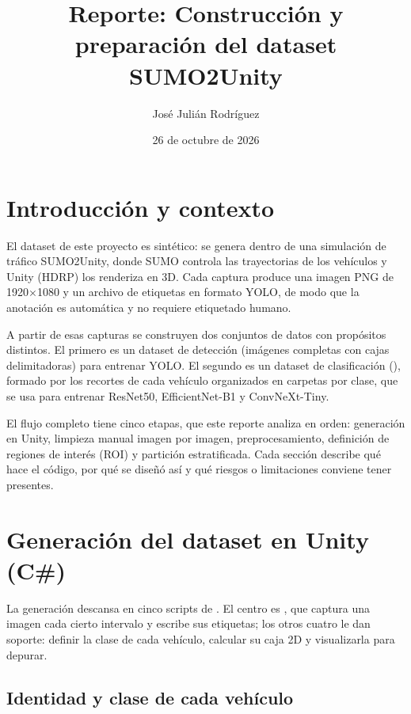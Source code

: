 \documentclass[11pt,a4paper]{article}
\title{Reporte: Construcción y preparación del dataset SUMO2Unity}
\author{José Julián Rodríguez}
\date{26 de octubre de 2026}
\begin{document}
\maketitle

\section{Introducción y contexto}

El dataset de este proyecto es sintético: se genera dentro de una simulación de tráfico SUMO2Unity, donde SUMO controla las trayectorias de los vehículos y Unity (HDRP) los renderiza en 3D. Cada captura produce una imagen PNG de 1920$\times$1080 y un archivo de etiquetas en formato YOLO, de modo que la anotación es automática y no requiere etiquetado humano.

A partir de esas capturas se construyen dos conjuntos de datos con propósitos distintos. El primero es un dataset de detección (imágenes completas con cajas delimitadoras) para entrenar YOLO. El segundo es un dataset de clasificación (), formado por los recortes de cada vehículo organizados en carpetas por clase, que se usa para entrenar ResNet50, EfficientNet-B1 y ConvNeXt-Tiny.

El flujo completo tiene cinco etapas, que este reporte analiza en orden: generación en Unity, limpieza manual imagen por imagen, preprocesamiento, definición de regiones de interés (ROI) y partición estratificada. Cada sección describe qué hace el código, por qué se diseñó así y qué riesgos o limitaciones conviene tener presentes.

\section{Generación del dataset en Unity (C\#)}

La generación descansa en cinco scripts de . El centro es , que captura una imagen cada cierto intervalo y escribe sus etiquetas; los otros cuatro le dan soporte: definir la clase de cada vehículo, calcular su caja 2D y visualizarla para depurar.

\subsection{Identidad y clase de cada vehículo}
\end{document}
